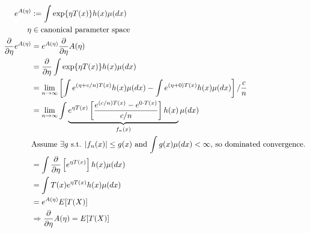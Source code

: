 \documentclass[twoside]{article}
\begin{document}
\begin{example}
\begin{align*}
  e^{A(\eta)} &:= \int \exp\{\eta T(x) \} h(x) \mu(dx) \\
  \eta &\in \text{canonical parameter space} \\
  \frac{\partial}{\partial \eta} e^{A(\eta)} &= e^{A(\eta)}
  \frac{\partial}{\partial \eta}A(\eta) \\
  &= \frac{\partial}{\partial \eta} \int \exp\{\eta T(x) \} h(x) \mu(dx)\\
  &= \lim_{n \rightarrow \infty} \left[ \int e^{(\eta + c/n)T(x)} h(x) \mu(dx) -
  \int e^{(\eta + 0)T(x)} h(x) \mu(dx) \right]/ \frac{c}{n} \\
  &= \lim_{n \rightarrow \infty} \int \underbrace{e^{\eta T(x)} \left[
  \frac{e^{(c/n)T(x)} - e^{0 \cdot T(x)}}{c/n} \right] h(x)}_{f_n(x)} \mu(dx) \\
  & \text{Assume $\exists g$ s.t. $|f_n(x)| \le g(x)$ and $\int g(x) \mu(dx) <
  \infty$, so dominated convergence.} \\
  &= \int \frac{\partial}{\partial \eta} \left[e^{\eta T(x)}\right] h(x) \mu(dx) \\
  &= \int T(x) e^{\eta T(x)} h(x) \mu(dx)  \\
  &= e^{A(\eta)} E[T(X)] \\
  &\Rightarrow \frac{\partial}{\partial \eta} A(\eta) = E[T(X)]
\end{align*}
\end{example}




\end{document}
